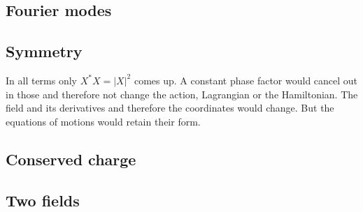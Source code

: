 \documentclass[11pt, english, fleqn, DIV=15, headinclude, BCOR=1cm]{scrartcl}
\begin{document}
\subsection{Fourier modes}

\subsection{Symmetry}

In all terms only $X^*X = |X|^2$ comes up. A constant phase factor would cancel
out in those and therefore not change the action, Lagrangian or the
Hamiltonian. The field and its derivatives and therefore the coordinates would
change. But the equations of motions would retain their form.

\subsection{Conserved charge}

\subsection{Two fields}
\end{document}
